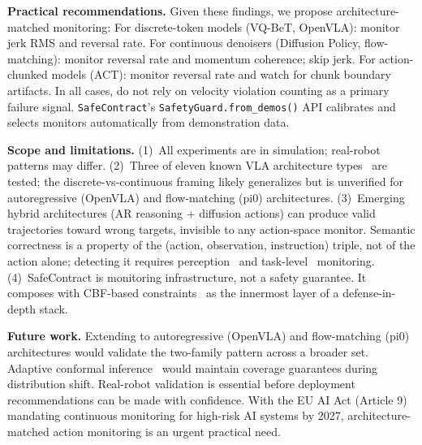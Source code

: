 \documentclass[conference]{IEEEtran}
\begin{document}
\textbf{Practical recommendations.}
Given these findings, we propose architecture-matched monitoring:
For discrete-token models (VQ-BeT, OpenVLA): monitor jerk RMS and reversal rate.
For continuous denoisers (Diffusion Policy, flow-matching): monitor reversal rate and momentum coherence; skip jerk.
For action-chunked models (ACT): monitor reversal rate and watch for chunk boundary artifacts.
In all cases, do not rely on velocity violation counting as a primary failure signal.
\texttt{SafeContract}'s \texttt{SafetyGuard.from\_demos()} API calibrates and selects monitors automatically from demonstration data.

\textbf{Scope and limitations.}
(1)~All experiments are in simulation; real-robot patterns may differ.
(2)~Three of eleven known VLA architecture types~\cite{openvla,pi0} are tested; the discrete-vs-continuous framing likely generalizes but is unverified for autoregressive (OpenVLA) and flow-matching (pi0) architectures.
(3)~Emerging hybrid architectures (AR reasoning + diffusion actions) can produce valid trajectories toward wrong targets, invisible to any action-space monitor.
Semantic correctness is a property of the (action, observation, instruction) triple, not of the action alone; detecting it requires perception~\cite{fiper2025} and task-level~\cite{sentinel} monitoring.
(4)~SafeContract is monitoring infrastructure, not a safety guarantee. It composes with CBF-based constraints~\cite{aegis} as the innermost layer of a defense-in-depth stack.

\textbf{Future work.}
Extending to autoregressive (OpenVLA) and flow-matching (pi0) architectures would validate the two-family pattern across a broader set.
Adaptive conformal inference~\cite{gibbs2021} would maintain coverage guarantees during distribution shift.
Real-robot validation is essential before deployment recommendations can be made with confidence.
With the EU AI Act (Article 9) mandating continuous monitoring for high-risk AI systems by 2027, architecture-matched action monitoring is an urgent practical need.
\end{document}
